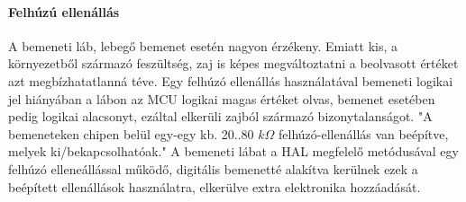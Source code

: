 \paragraph{Felhúzú ellenállás}
A bemeneti láb, lebegő bemenet esetén nagyon érzékeny.
Emiatt kis, a környezetből származó feszültség, zaj is képes megváltoztatni a beolvasott értéket azt megbízhatatlanná téve.
Egy felhúzó ellenállás használatával bemeneti logikai jel hiányában a lábon az MCU logikai magas értéket olvas, bemenet esetében pedig logikai alacsonyt, ezáltal elkerüli zajból származó bizonytalanságot.
"A bemeneteken chipen belül egy-egy kb. 20..80 $k\Omega$ felhúzó-ellenállás van beépítve,
melyek ki/bekapcsolhatóak."\cite{evans2011arduino}
A bemeneti lábat a HAL megfelelő metódusával egy felhúzó elleneállással működő, digitális bemenetté alakítva kerülnek ezek a beépített  ellenállások használatra, elkerülve extra elektronika hozzáadását.